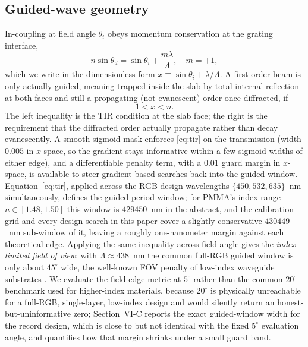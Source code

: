 \documentclass[10pt,twocolumn]{article}
\begin{document}
\subsection{Guided-wave geometry}
In-coupling at field angle $\theta_i$ obeys momentum conservation at the
grating interface,
\begin{equation}
n\sin\theta_d = \sin\theta_i + \frac{m\lambda}{\Lambda}, \quad m=+1,
\label{eq:grating}
\end{equation}
which we write in the dimensionless form $x \equiv \sin\theta_i +
\lambda/\Lambda$. A first-order beam is only actually guided, meaning
trapped inside the slab by total internal reflection at both faces and
still a propagating (not evanescent) order once diffracted, if
\begin{equation}
1 < x < n.
\label{eq:tir}
\end{equation}
The left inequality is the TIR condition at the slab face; the right is the
requirement that the diffracted order actually propagate rather than decay
evanescently. A smooth sigmoid mask enforces \eqref{eq:tir} on the
transmission (width $0.005$ in $x$-space, so the gradient stays informative
within a few sigmoid-widths of either edge), and a differentiable penalty
term, with a $0.01$ guard margin in $x$-space, is available to steer
gradient-based searches back into the guided window. Equation~\eqref{eq:tir},
applied across the RGB design wavelengths $\{450, 532, 635\}$~nm
simultaneously, defines the guided period window; for PMMA's index range
$n\in[1.48,1.50]$ this window is $429$\textendash$450$~nm in the abstract,
and the calibration grid and every design search in this paper cover a
slightly conservative $430$\textendash$449$~nm sub-window of it, leaving a
roughly one-nanometer margin against each theoretical edge. Applying the
same inequality across field angle gives the \emph{index-limited field of
view}: with $\Lambda \approx 438$~nm the common full-RGB guided window is
only about $4$\textendash$5^\circ$ wide, the well-known FOV penalty of
low-index waveguide substrates \cite{kress2021}. We evaluate the field-edge
metric at $5^\circ$ rather than the common $20^\circ$ benchmark used for
higher-index materials, because $20^\circ$ is physically unreachable for a
full-RGB, single-layer, low-index design and would silently return an
honest-but-uninformative zero; Section~VI-C reports the exact guided-window
width for the record design, which is close to but not identical with the
fixed $5^\circ$ evaluation angle, and quantifies how that margin shrinks
under a small guard band.
\end{document}
